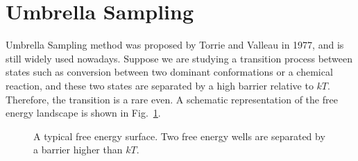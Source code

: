 \section{Umbrella Sampling\label{Sec:ES:US}}
Umbrella Sampling method was proposed by Torrie and Valleau in 1977,\cite{TorrieJComputP1977} and is still widely used nowadays.
Suppose we are studying a transition process between states such as conversion between two dominant conformations or a chemical reaction, and these two states are separated by a high barrier relative to $kT$. Therefore, the transition is a rare even. A schematic representation of the free energy landscape is shown in Fig.~\ref{Fig:ES:dual_harmonic}.
\begin{figure}[htbp]
	\centering
	\caption{A typical free energy surface. Two free energy wells are separated by a barrier higher than $kT$.}\label{Fig:ES:dual_harmonic}
\end{figure}


